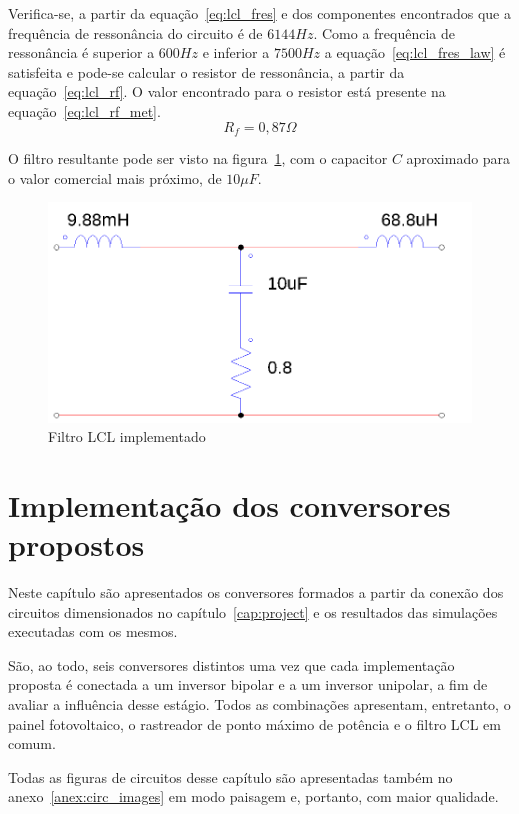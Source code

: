 \documentclass[
	12pt,				%
	openany,
	onseside,
	a4paper,			%
	english,			%
	french,				%
	spanish,			%
	brazil,				%
	]{abntex2}
\begin{document}
Verifica-se, a partir da equação~\ref{eq:lcl_fres} e dos componentes encontrados que a frequência de ressonância do circuito é de $6144Hz$. Como a frequência de ressonância é superior a $600Hz$ e inferior a $7500Hz$ a equação~\ref{eq:lcl_fres_law} é satisfeita e pode-se calcular o resistor de ressonância, a partir da equação~\ref{eq:lcl_rf}. O valor encontrado para o resistor está presente na equação~\ref{eq:lcl_rf_met}.
\begin{equation}%
	R_f = 0,87 \Omega \label{eq:lcl_rf_met}
\end{equation}

O filtro resultante pode ser visto na figura~\ref{fig:lcl_filter_impl}, com o capacitor $C$ aproximado para o valor comercial mais próximo, de $10 \mu F$.

\begin{figure}[H]%
	\begin{center}%
		\includegraphics[width=0.65 \linewidth]{lcl_filter_psim}
		\caption{Filtro LCL implementado}
		\label{fig:lcl_filter_impl}
	\end{center}
\end{figure}

\chapter{Implementação dos conversores propostos}

Neste capítulo são apresentados os conversores formados a partir da conexão dos circuitos dimensionados no capítulo~\ref{cap:project} e os resultados das simulações executadas com os mesmos.

São, ao todo, seis conversores distintos uma vez que cada implementação proposta é conectada a um inversor bipolar e a um inversor unipolar, a fim de avaliar a influência desse estágio. Todos as combinações apresentam, entretanto, o painel fotovoltaico, o rastreador de ponto máximo de potência e o filtro LCL em comum.

Todas as figuras de circuitos desse capítulo são apresentadas também no anexo~\ref{anex:circ_images} em modo paisagem e, portanto, com maior qualidade.
\end{document}
